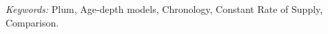 \documentclass [10pt] {article}
\begin{document}
\begin{abstract}
\end{abstract}
	\noindent%
	{\it Keywords:} Plum, Age-depth models, Chronology, Constant Rate of Supply, Comparison.
	\vfill
	\newpage

\end{document}
